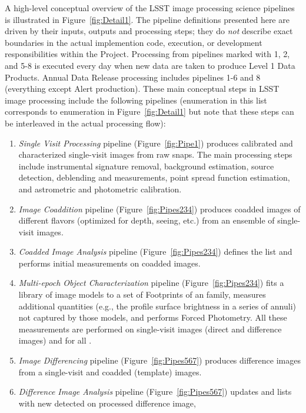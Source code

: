 \documentclass[SE,lsstdraft,toc]{lsstdoc}
\begin{document}
A high-level conceptual overview of the LSST image processing science pipelines is illustrated
in Figure~\ref{fig:Detail1}. The pipeline definitions presented here are driven by their inputs,
outputs and processing steps; they do \textit{not} describe exact boundaries in the actual implemention
code, execution, or development responsibilities within the Project.
Processing from pipelines marked with 1, 2, and 5-8 is executed every day when new data are taken
to produce Level 1 Data Products. Annual Data Release processing includes pipelines 1-6 and 8
(everything except Alert production). These main conceptual steps in LSST image processing
include the following pipelines (enumeration in this list corresponds to enumeration in Figure~\ref{fig:Detail1}
but note that these steps can be interleaved in the actual processing flow):
\begin{enumerate}
\item \textit{Single Visit Processing} pipeline (Figure~\ref{fig:Pipe1}) produces calibrated and
characterized single-visit images from raw snaps. The main processing steps include instrumental
signature removal, background estimation, source detection, deblending and measurements,
point spread function estimation, and astrometric and photometric calibration.
\item \textit{Image Coaddition} pipeline (Figure~\ref{fig:Pipes234}) produces coadded images
of different flavors (optimized for depth, seeing, etc.) from an ensemble of single-visit images.
\item \textit{Coadded Image Analysis} pipeline (Figure~\ref{fig:Pipes234}) defines the \Object list
and performs initial measurements on coadded images.
\item \textit{Multi-epoch Object Characterization} pipeline (Figure~\ref{fig:Pipes234}) fits a library
of image models to a set of Footprints of an \Object family, measures additional quantities (e.g.,
the profile surface brightness in a series of annuli) not captured by those models, and performs
Forced Photometry. All these measurements are performed on single-visit images (direct and
difference images) and for all \Objects.
\item \textit{Image Differencing} pipeline (Figure~\ref{fig:Pipes567}) produces difference images
from a single-visit and coadded (template) images.
\item \textit{Difference Image Analysis} pipeline (Figure~\ref{fig:Pipes567}) updates
\DIAObject and \SSObject lists with new \DIASources detected on processed difference image,

\end{enumerate}
\end{document}
